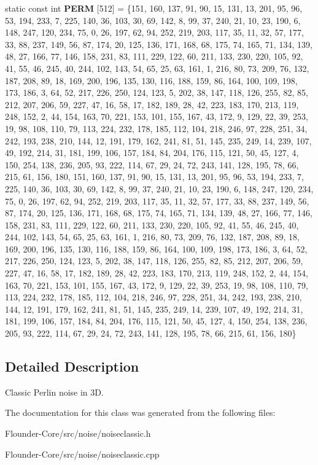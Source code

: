 \begin{DoxyCompactItemize}
static const int {\bfseries P\+E\+RM} \mbox{[}512\mbox{]} = \{151, 160, 137, 91, 90, 15, 131, 13, 201, 95, 96, 53, 194, 233, 7, 225, 140, 36, 103, 30, 69, 142, 8, 99, 37, 240, 21, 10, 23, 190, 6, 148, 247, 120, 234, 75, 0, 26, 197, 62, 94, 252, 219, 203, 117, 35, 11, 32, 57, 177, 33, 88, 237, 149, 56, 87, 174, 20, 125, 136, 171, 168, 68, 175, 74, 165, 71, 134, 139, 48, 27, 166, 77, 146, 158, 231, 83, 111, 229, 122, 60, 211, 133, 230, 220, 105, 92, 41, 55, 46, 245, 40, 244, 102, 143, 54, 65, 25, 63, 161, 1, 216, 80, 73, 209, 76, 132, 187, 208, 89, 18, 169, 200, 196, 135, 130, 116, 188, 159, 86, 164, 100, 109, 198, 173, 186, 3, 64, 52, 217, 226, 250, 124, 123, 5, 202, 38, 147, 118, 126, 255, 82, 85, 212, 207, 206, 59, 227, 47, 16, 58, 17, 182, 189, 28, 42, 223, 183, 170, 213, 119, 248, 152, 2, 44, 154, 163, 70, 221, 153, 101, 155, 167, 43, 172, 9, 129, 22, 39, 253, 19, 98, 108, 110, 79, 113, 224, 232, 178, 185, 112, 104, 218, 246, 97, 228, 251, 34, 242, 193, 238, 210, 144, 12, 191, 179, 162, 241, 81, 51, 145, 235, 249, 14, 239, 107, 49, 192, 214, 31, 181, 199, 106, 157, 184, 84, 204, 176, 115, 121, 50, 45, 127, 4, 150, 254, 138, 236, 205, 93, 222, 114, 67, 29, 24, 72, 243, 141, 128, 195, 78, 66, 215, 61, 156, 180, 151, 160, 137, 91, 90, 15, 131, 13, 201, 95, 96, 53, 194, 233, 7, 225, 140, 36, 103, 30, 69, 142, 8, 99, 37, 240, 21, 10, 23, 190, 6, 148, 247, 120, 234, 75, 0, 26, 197, 62, 94, 252, 219, 203, 117, 35, 11, 32, 57, 177, 33, 88, 237, 149, 56, 87, 174, 20, 125, 136, 171, 168, 68, 175, 74, 165, 71, 134, 139, 48, 27, 166, 77, 146, 158, 231, 83, 111, 229, 122, 60, 211, 133, 230, 220, 105, 92, 41, 55, 46, 245, 40, 244, 102, 143, 54, 65, 25, 63, 161, 1, 216, 80, 73, 209, 76, 132, 187, 208, 89, 18, 169, 200, 196, 135, 130, 116, 188, 159, 86, 164, 100, 109, 198, 173, 186, 3, 64, 52, 217, 226, 250, 124, 123, 5, 202, 38, 147, 118, 126, 255, 82, 85, 212, 207, 206, 59, 227, 47, 16, 58, 17, 182, 189, 28, 42, 223, 183, 170, 213, 119, 248, 152, 2, 44, 154, 163, 70, 221, 153, 101, 155, 167, 43, 172, 9, 129, 22, 39, 253, 19, 98, 108, 110, 79, 113, 224, 232, 178, 185, 112, 104, 218, 246, 97, 228, 251, 34, 242, 193, 238, 210, 144, 12, 191, 179, 162, 241, 81, 51, 145, 235, 249, 14, 239, 107, 49, 192, 214, 31, 181, 199, 106, 157, 184, 84, 204, 176, 115, 121, 50, 45, 127, 4, 150, 254, 138, 236, 205, 93, 222, 114, 67, 29, 24, 72, 243, 141, 128, 195, 78, 66, 215, 61, 156, 180\}
\end{DoxyCompactItemize}


\subsection{Detailed Description}
Classic Perlin noise in 3D. 



The documentation for this class was generated from the following files\+:\begin{DoxyCompactItemize}
\item 
Flounder-\/\+Core/src/noise/noiseclassic.\+h\item 
Flounder-\/\+Core/src/noise/noiseclassic.\+cpp\end{DoxyCompactItemize}
